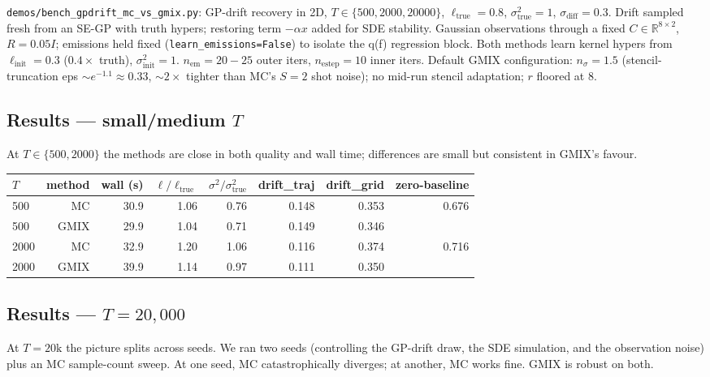 \documentclass[11pt]{article}
\newcommand{\code}[1]{\texttt{\small #1}}
\begin{document}
\code{demos/bench\_gpdrift\_mc\_vs\_gmix.py}: GP-drift recovery in 2D,
$T \in \{500, 2000, 20000\}$, $\ell_{\text{true}} = 0.8$,
$\sigma^2_{\text{true}} = 1$, $\sigma_{\text{diff}} = 0.3$.  Drift
sampled fresh from an SE-GP with truth hypers; restoring term $-\alpha
x$ added for SDE stability.  Gaussian observations through a fixed $C
\in \mathbb{R}^{8\times 2}$, $R = 0.05 I$; emissions held fixed
(\code{learn\_emissions=False}) to isolate the q(f) regression block.
Both methods learn kernel hypers from $\ell_{\text{init}} = 0.3$
($0.4\times$ truth), $\sigma^2_{\text{init}} = 1$.  $n_\text{em} = 20{-}25$
outer iters, $n_\text{estep} = 10$ inner iters.  Default GMIX
configuration: $n_\sigma = 1.5$ (stencil-truncation eps $\sim e^{-1.1}
\approx 0.33$, ${\sim}\!2\times$ tighter than MC's $S\!=\!2$ shot noise);
no mid-run stencil adaptation; $r$ floored at 8.

\subsection{Results --- small/medium $T$}

At $T \in \{500, 2000\}$ the methods are close in both quality and
wall time; differences are small but consistent in GMIX's favour.

\begin{center}
\renewcommand{\arraystretch}{1.2}
\begin{tabular}{lrrrrrrr}
\toprule
$T$ & method & wall (s) & $\ell/\ell_\text{true}$ & $\sigma^2/\sigma^2_\text{true}$
& drift\_traj & drift\_grid & zero-baseline\\
\midrule
 500 & MC    &  30.9 & 1.06 & 0.76 & 0.148 & 0.353 & 0.676\\
 500 & GMIX  &  29.9 & 1.04 & 0.71 & 0.149 & 0.346 &      \\
2000 & MC    &  32.9 & 1.20 & 1.06 & 0.116 & 0.374 & 0.716\\
2000 & GMIX  &  39.9 & 1.14 & 0.97 & 0.111 & 0.350 &      \\
\bottomrule
\end{tabular}
\end{center}

\subsection{Results --- $T = 20{,}000$}

At $T = 20\text{k}$ the picture splits across seeds.  We ran two seeds
(controlling the GP-drift draw, the SDE simulation, and the
observation noise) plus an MC sample-count sweep.  At one seed, MC
catastrophically diverges; at another, MC works fine.  GMIX is
robust on both.
\end{document}
